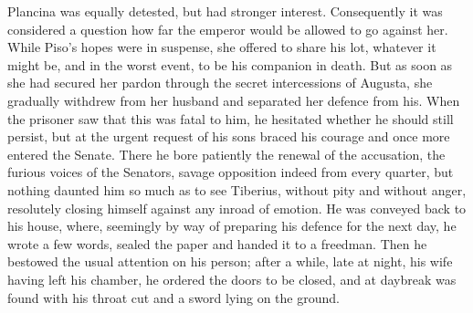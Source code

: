 
Plancina was equally detested, but had stronger interest. Consequently it was considered a question how far the emperor would be allowed to go against her. While Piso's hopes were in suspense, she offered to share his lot, whatever it might be, and in the worst event, to be his companion in death. But as soon as she had secured her pardon through the secret intercessions of Augusta, she gradually withdrew from her husband and separated her defence from his. When the prisoner saw that this was fatal to him, he hesitated whether he should still persist, but at the urgent request of his sons braced his courage and once more entered the Senate. There he bore patiently the renewal of the accusation, the furious voices of the Senators, savage opposition indeed from every quarter, but nothing daunted him so much as to see Tiberius, without pity and without anger, resolutely closing himself against any inroad of emotion. He was conveyed back to his house, where, seemingly by way of preparing his defence for the next day, he wrote a few words, sealed the paper and handed it to a freedman. Then he bestowed the usual attention on his person; after a while, late at night, his wife having left his chamber, he ordered the doors to be closed, and at daybreak was found with his throat cut and a sword lying on the ground.


